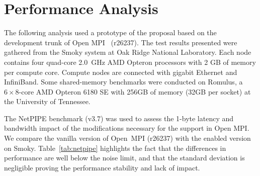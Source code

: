 \section{Performance Analysis}
\label{sect:performance}

The following analysis used a prototype of the \ulfm proposal based on
the development trunk of Open MPI~\cite{gabriel04:_open_mpi} (r26237).
The test results presented were gathered from the Smoky system at Oak
Ridge National Laboratory. Each node contains four quad-core 2.0~GHz AMD
Opteron processors with 2 GB of memory per compute core. Compute nodes
are connected with gigabit Ethernet and InfiniBand. Some shared-memory
benchmarks were conducted on Romulus, a $6\times8$-core AMD Opteron 6180
SE with 256GB of memory (32GB per socket) at the University of Tennessee.

The NetPIPE benchmark
(v3.7) was used to assess the 1-byte latency and bandwidth
impact of the modifications necessary for the \ulfm support in Open MPI.
We compare the vanilla version of Open~MPI (r26237) with the \ulfm enabled
version on Smoky. Table~\ref{tab:netpipe} highlights the fact that the differences in
performance are well below the noise limit, and that the standard deviation is
negligible proving the performance stability and lack of impact.

